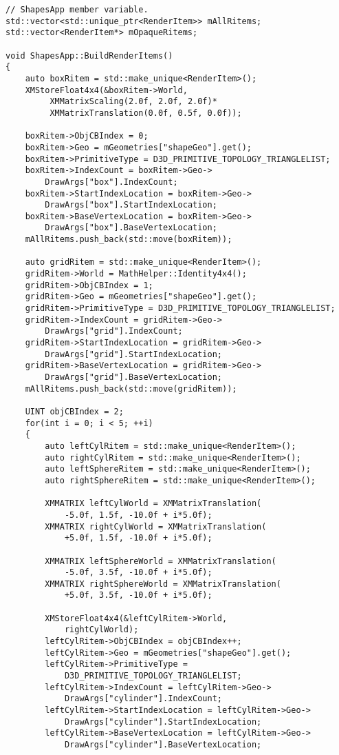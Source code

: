 \begin{lstlisting}
// ShapesApp member variable.
std::vector<std::unique_ptr<RenderItem>> mAllRitems;
std::vector<RenderItem*> mOpaqueRitems;

void ShapesApp::BuildRenderItems()
{
    auto boxRitem = std::make_unique<RenderItem>();
    XMStoreFloat4x4(&boxRitem->World, 
         XMMatrixScaling(2.0f, 2.0f, 2.0f)*
         XMMatrixTranslation(0.0f, 0.5f, 0.0f));

    boxRitem->ObjCBIndex = 0;
    boxRitem->Geo = mGeometries["shapeGeo"].get();
    boxRitem->PrimitiveType = D3D_PRIMITIVE_TOPOLOGY_TRIANGLELIST;
    boxRitem->IndexCount = boxRitem->Geo->
        DrawArgs["box"].IndexCount;
    boxRitem->StartIndexLocation = boxRitem->Geo->
        DrawArgs["box"].StartIndexLocation;
    boxRitem->BaseVertexLocation = boxRitem->Geo->
        DrawArgs["box"].BaseVertexLocation;
    mAllRitems.push_back(std::move(boxRitem));

    auto gridRitem = std::make_unique<RenderItem>();
    gridRitem->World = MathHelper::Identity4x4();
    gridRitem->ObjCBIndex = 1;
    gridRitem->Geo = mGeometries["shapeGeo"].get();
    gridRitem->PrimitiveType = D3D_PRIMITIVE_TOPOLOGY_TRIANGLELIST;
    gridRitem->IndexCount = gridRitem->Geo->
        DrawArgs["grid"].IndexCount;
    gridRitem->StartIndexLocation = gridRitem->Geo->
        DrawArgs["grid"].StartIndexLocation;
    gridRitem->BaseVertexLocation = gridRitem->Geo->
        DrawArgs["grid"].BaseVertexLocation;
    mAllRitems.push_back(std::move(gridRitem));

    UINT objCBIndex = 2;
    for(int i = 0; i < 5; ++i)
    {
        auto leftCylRitem = std::make_unique<RenderItem>();
        auto rightCylRitem = std::make_unique<RenderItem>();
        auto leftSphereRitem = std::make_unique<RenderItem>();
        auto rightSphereRitem = std::make_unique<RenderItem>();

        XMMATRIX leftCylWorld = XMMatrixTranslation(
            -5.0f, 1.5f, -10.0f + i*5.0f);
        XMMATRIX rightCylWorld = XMMatrixTranslation(
            +5.0f, 1.5f, -10.0f + i*5.0f);

        XMMATRIX leftSphereWorld = XMMatrixTranslation(
            -5.0f, 3.5f, -10.0f + i*5.0f);
        XMMATRIX rightSphereWorld = XMMatrixTranslation(
            +5.0f, 3.5f, -10.0f + i*5.0f);

        XMStoreFloat4x4(&leftCylRitem->World, 
            rightCylWorld);
        leftCylRitem->ObjCBIndex = objCBIndex++;
        leftCylRitem->Geo = mGeometries["shapeGeo"].get();
        leftCylRitem->PrimitiveType = 
            D3D_PRIMITIVE_TOPOLOGY_TRIANGLELIST;
        leftCylRitem->IndexCount = leftCylRitem->Geo->
            DrawArgs["cylinder"].IndexCount;
        leftCylRitem->StartIndexLocation = leftCylRitem->Geo->
            DrawArgs["cylinder"].StartIndexLocation;
        leftCylRitem->BaseVertexLocation = leftCylRitem->Geo->
            DrawArgs["cylinder"].BaseVertexLocation;


\end{lstlisting}
